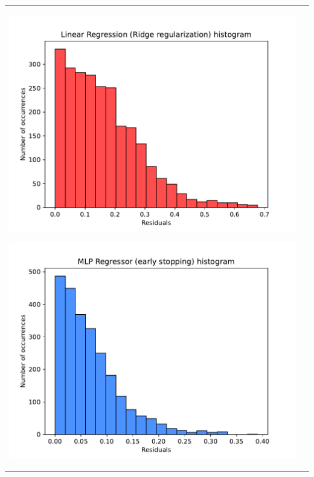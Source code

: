 \documentclass[11pt,a4paper]{article}
\begin{document}
\begin{flushleft}
\begin{tabularx}{1.09\textwidth} {X X}
  \hspace{-4.75mm}\includegraphics[scale=0.6]{hw03_plot_linreg_hist} \par
  \vspace{-2mm}\hspace{-4.75mm}\includegraphics[scale=0.6]{hw03_plot_mlp1_hist} \par
\end{tabularx}
\end{flushleft}
\end{document}
